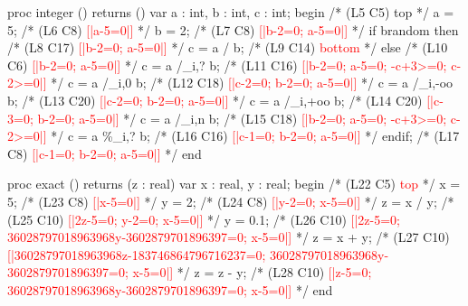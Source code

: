 \documentclass[a4paper,11pt]{article}
\newenvironment{prog}
{\begin{example}\color{prog}}
{\end{example}\par}
\begin{document}
{
\begin{prog}\footnotesize
proc integer () returns () var a : int, b : int, c : int;
begin
  /* (L5 C5) top */
  a = 5; /* (L6 C8) \textcolor{red}{[|a-5=0|]} */
  b = 2; /* (L7 C8) \textcolor{red}{[|b-2=0; a-5=0|]} */
  if brandom then
     /* (L8 C17) \textcolor{red}{[|b-2=0; a-5=0|]} */
     c = a / b; /* (L9 C14) \textcolor{red}{bottom} */
  else
    /* (L10 C6) \textcolor{red}{[|b-2=0; a-5=0|]} */
    c = a /_i,? b; /* (L11 C16) \textcolor{red}{[|b-2=0; a-5=0; -c+3>=0; c-2>=0|]} */
    c = a /_i,0 b; /* (L12 C18) \textcolor{red}{[|c-2=0; b-2=0; a-5=0|]} */
    c = a /_i,-oo b; /* (L13 C20) \textcolor{red}{[|c-2=0; b-2=0; a-5=0|]} */
    c = a /_i,+oo b; /* (L14 C20) \textcolor{red}{[|c-3=0; b-2=0; a-5=0|]} */
    c = a /_i,n b; /* (L15 C18) \textcolor{red}{[|b-2=0; a-5=0; -c+3>=0; c-2>=0|]} */
    c = a \%_i,? b; /* (L16 C16) \textcolor{red}{[|c-1=0; b-2=0; a-5=0|]} */
  endif; /* (L17 C8) \textcolor{red}{[|c-1=0; b-2=0; a-5=0|]} */
end

proc exact () returns (z : real) var x : real, y : real;
begin
  /* (L22 C5) \textcolor{red}{top} */
  x = 5; /* (L23 C8) \textcolor{red}{[|x-5=0|]} */
  y = 2; /* (L24 C8) \textcolor{red}{[|y-2=0; x-5=0|]} */
  z = x / y; /* (L25 C10) \textcolor{red}{[|2z-5=0; y-2=0; x-5=0|]} */
  y = 0.1; /* (L26 C10)
              \textcolor{red}{[|2z-5=0; 36028797018963968y-3602879701896397=0; x-5=0|]} */
  z = x + y; /* (L27 C10)
                \textcolor{red}{[|36028797018963968z-183746864796716237=0;
                  36028797018963968y-3602879701896397=0; x-5=0|]} */
  z = z - y; /* (L28 C10)
                \textcolor{red}{[|z-5=0; 36028797018963968y-3602879701896397=0; x-5=0|]} */
end


\end{prog}}
\end{document}
